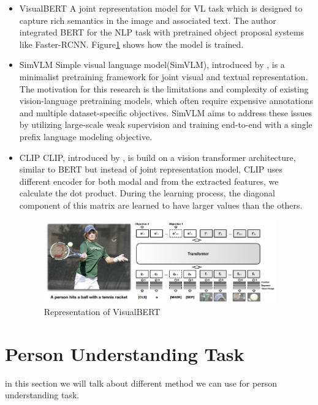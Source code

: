 
\begin{itemize}
    \item VisualBERT
    A joint representation model for VL task which is designed to capture rich semantics in the image and associated text. The author integrated BERT for the NLP task with pretrained object proposal systems like Faster-RCNN. Figure\ref{fig:visualvert} shows how the model is trained. 
    \item SimVLM
    Simple visual language model(SimVLM), introduced by \cite{wang2022simvlm}, is a minimalist pretraining framework for joint visual and textual representation. The motivation for this research is the limitations and complexity of existing vision-language pretraining models, which often require expensive annotations and multiple dataset-specific objectives. SimVLM aims to address these issues by utilizing large-scale weak supervision and training end-to-end with a single prefix language modeling objective.


    \item CLIP
    CLIP, introduced by \cite{radford2021learning}, is build on a vision transformer architecture, similar to BERT but instead of joint representation model, CLIP uses different encoder for both modal and from the extracted features, we calculate the dot product. During the learning process, the diagonal component of this matrix are learned to have larger values than the others.
    \begin{figure}[htbp]
        \begin{center}
            \includegraphics[width=10cm]{img/VisualBERT.png}
            \caption{Representation of VisualBERT}\label{fig:visualvert}
        \end{center}
    \end{figure}
\end{itemize}


\section{Person Understanding Task}
in this section we will talk about different method we can use for person understanding task. 

